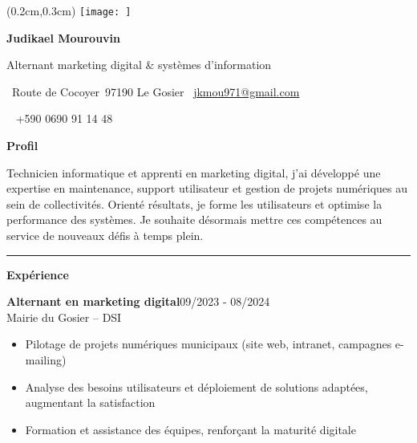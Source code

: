\documentclass[a4paper]{article}
\renewcommand{\colorbox}[2]{#2}%
\newcommand{\fullrule}{\hspace{-1.5cm}\rule{\paperwidth}{0.4pt}}
\newcommand{\cvsection}[1]{%
  \vspace{6pt}\textbf{\Large #1}\par\vspace{2pt}}
\begin{document}
\color{white}
\ifx\relax\relax\else
\begin{textblock*}{4cm}(0.2cm,0.3cm)
  \texttt{[image: ]}
\end{textblock*}
 \fi
\begin{center}
  {\fontsize{44pt}{24pt}\selectfont\bfseries Judikael Mourouvin}

  \bigskip
  {\Large Alternant marketing digital \& systèmes d'information}

  \bigskip\bigskip
  \faMapMarker~Route de Cocoyer\ 97190 Le Gosier
  \quad\faEnvelope~\href{mailto:jkmou971@gmail.com}{jkmou971@gmail.com}

  \bigskip
  \faPhone~ +590 0690 91 14 48
  \quad \faLinkedin\ \href{}{}
 

  \vspace{-0.3cm}
  
\end{center}
\cvsection{Profil}

Technicien informatique et apprenti en marketing digital, j’ai développé une expertise en maintenance, support utilisateur et gestion de projets numériques au sein de collectivités. Orienté résultats, je forme les utilisateurs et optimise la performance des systèmes. Je souhaite désormais mettre ces compétences au service de nouveaux défis à temps plein.

\medskip\fullrule

\cvsection{Expérience}
\colorbox{maincolor}{%
  \begin{minipage}{\linewidth}
    \noindent
    \textbf{Alternant en marketing digital}\hfill 09/2023 - 08/2024\\
    Mairie du Gosier – DSI\\[-0.3em]
    \begin{itemize}[leftmargin=*]
      \item Pilotage de projets numériques municipaux (site web, intranet, campagnes e-mailing) \item Analyse des besoins utilisateurs et déploiement de solutions adaptées, augmentant la satisfaction \item Formation et assistance des équipes, renforçant la maturité digitale
    \end{itemize}
  \end{minipage}}
\end{document}
